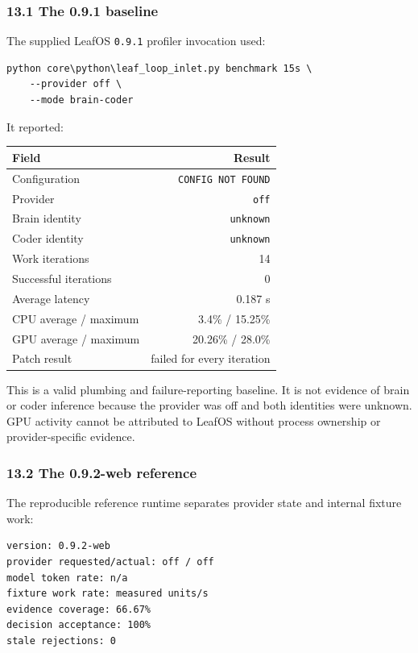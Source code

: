 \subsubsection{13.1 The 0.9.1 baseline}

The supplied LeafOS \texttt{0.9.1} profiler invocation used:

\begin{verbatim}
python core\python\leaf_loop_inlet.py benchmark 15s \
    --provider off \
    --mode brain-coder
\end{verbatim}

It reported:

{\def\LTcaptype{none} %
\begin{longtable}[]{@{}lr@{}}
\toprule\noalign{}
Field & Result \\
\midrule\noalign{}
\endhead
\bottomrule\noalign{}
\endlastfoot
Configuration & \texttt{CONFIG\ NOT\ FOUND} \\
Provider & \texttt{off} \\
Brain identity & \texttt{unknown} \\
Coder identity & \texttt{unknown} \\
Work iterations & 14 \\
Successful iterations & 0 \\
Average latency & 0.187 s \\
CPU average / maximum & 3.4\% / 15.25\% \\
GPU average / maximum & 20.26\% / 28.0\% \\
Patch result & failed for every iteration \\
\end{longtable}
}

This is a valid plumbing and failure-reporting baseline. It is not evidence of
brain or coder inference because the provider was off and both identities were
unknown. GPU activity cannot be attributed to LeafOS without process ownership
or provider-specific evidence.

\subsubsection{13.2 The 0.9.2-web reference}

The reproducible reference runtime separates provider state and internal
fixture work:

\begin{verbatim}
version: 0.9.2-web
provider requested/actual: off / off
model token rate: n/a
fixture work rate: measured units/s
evidence coverage: 66.67%
decision acceptance: 100%
stale rejections: 0
\end{verbatim}

